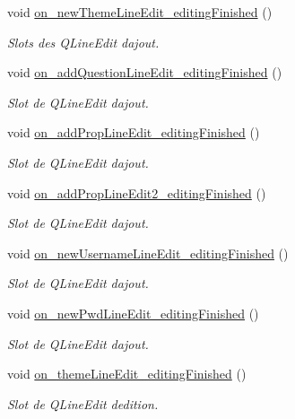 \begin{DoxyCompactItemize}
void \mbox{\hyperlink{classManageWindow_a04e344f40ac0714f5ae807499b58ad2d}{on\+\_\+new\+Theme\+Line\+Edit\+\_\+editing\+Finished}} ()
\begin{DoxyCompactList}\small\item\em Slots des Q\+Line\+Edit d\textquotesingle{}ajout. \end{DoxyCompactList}\item 
void \mbox{\hyperlink{classManageWindow_a7aa50da39db54a80f5cc1462bf830657}{on\+\_\+add\+Question\+Line\+Edit\+\_\+editing\+Finished}} ()
\begin{DoxyCompactList}\small\item\em Slot de Q\+Line\+Edit d\textquotesingle{}ajout. \end{DoxyCompactList}\item 
void \mbox{\hyperlink{classManageWindow_abcb9c2271d2726392ba811775ebcc685}{on\+\_\+add\+Prop\+Line\+Edit\+\_\+editing\+Finished}} ()
\begin{DoxyCompactList}\small\item\em Slot de Q\+Line\+Edit d\textquotesingle{}ajout. \end{DoxyCompactList}\item 
void \mbox{\hyperlink{classManageWindow_ac66c5947e1a7e97e82b860471f185fa1}{on\+\_\+add\+Prop\+Line\+Edit2\+\_\+editing\+Finished}} ()
\begin{DoxyCompactList}\small\item\em Slot de Q\+Line\+Edit d\textquotesingle{}ajout. \end{DoxyCompactList}\item 
void \mbox{\hyperlink{classManageWindow_a9d53e0e1ca6c02d197d3b44926dbd5b7}{on\+\_\+new\+Username\+Line\+Edit\+\_\+editing\+Finished}} ()
\begin{DoxyCompactList}\small\item\em Slot de Q\+Line\+Edit d\textquotesingle{}ajout. \end{DoxyCompactList}\item 
void \mbox{\hyperlink{classManageWindow_a859f6ebcd55bb08d3013fd25fa902304}{on\+\_\+new\+Pwd\+Line\+Edit\+\_\+editing\+Finished}} ()
\begin{DoxyCompactList}\small\item\em Slot de Q\+Line\+Edit d\textquotesingle{}ajout. \end{DoxyCompactList}\item 
void \mbox{\hyperlink{classManageWindow_a642bd872d6a3e0ff95cc41cd57d4baa2}{on\+\_\+theme\+Line\+Edit\+\_\+editing\+Finished}} ()
\begin{DoxyCompactList}\small\item\em Slot de Q\+Line\+Edit d\textquotesingle{}edition. \end{DoxyCompactList}\item 

\end{DoxyCompactItemize}
